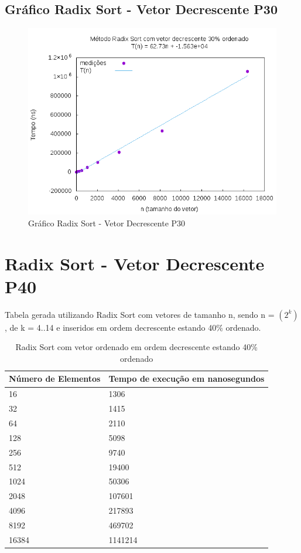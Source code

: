 \documentclass[12pt,a4paper,twoside]{report}
\begin{document}
\subsection{Gráfico Radix Sort - Vetor Decrescente P30}
\begin{figure}[H]
    \centering
    \includegraphics[width=0.7\linewidth]{graficos/RadixSort/vIntDecrescenteP30/vIntDecrescenteP30.png}
  \caption{Gráfico Radix Sort - Vetor Decrescente P30}
\end{figure}

\section{Radix Sort - Vetor Decrescente P40}
Tabela gerada utilizando Radix Sort com vetores de tamanho n, sendo n = $(2^k)$, de k = 4..14 e inseridos em ordem decrescente estando 40\% ordenado.
\begin{table}[H]
\centering
\caption{Radix Sort com vetor ordenado em ordem decrescente estando 40\% ordenado}
\label{my-label}
\begin{tabular}{|l|l|}
\hline
\multicolumn{1}{|c|}{\textbf{Número de Elementos}} & \multicolumn{1}{c|}{\textbf{Tempo de execução em nanosegundos}} \\ \hline
16 & 1306 \\ \hline
32 & 1415 \\ \hline
64 & 2110 \\ \hline
128 & 5098 \\ \hline
256 & 9740 \\ \hline
512 & 19400 \\ \hline
1024 & 50306 \\ \hline
2048 & 107601 \\ \hline
4096 & 217893 \\ \hline
8192 & 469702 \\ \hline
16384 & 1141214 \\ \hline
\end{tabular}
\end{table}
\end{document}
